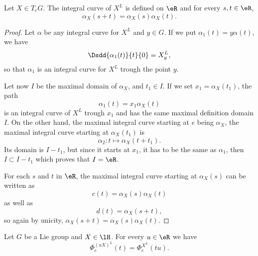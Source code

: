 \begin{proposition}     \label{PROPooWEYCooCvyHNr}
	Let \( X\in T_eG\). The integral curve of \( X^L\) is defined on \( \eR\) and for every \( s,t\in\eR\),
	\begin{equation}
		\alpha_X(s+t)=\alpha_X(s)\alpha_X(t).
	\end{equation}
\end{proposition}

\begin{proof}
	Let \( \alpha\) be any integral curve for \( X^L\) and \( y\in G\). If we put \( \alpha_1(t)=y\alpha(t)\), we have
	\begin{equation}
		\Dsdd{ \alpha_1(t) }{t}{0}=X^L_y,
	\end{equation}
	so that \( \alpha_1\) is an integral curve for \( X^L\) trough the point \( y\).

	Let now \( I\) be the maximal domain of \( \alpha_X\), and \( t_1\in I\). If we set \( x_1=\alpha_X(t_1)\), the path
	\begin{equation}
		\alpha_1(t)=x_1\alpha_X(t)
	\end{equation}
	is an integral curve of \( X^L\) trough \( x_1\) and has the same maximal definition domain \( I\). On the other hand, the maximal integral curve starting at \( e\) being \( \alpha_X\), the maximal integral curve starting at \( \alpha_X(t_1)\) is
	\begin{equation}
		\alpha_2\colon t\mapsto \alpha_X(t+t_1).
	\end{equation}
	Its domain is \( I-t_1\), but since it starts at \( x_1\), it has to be the same as \( \alpha_1\), then \( I\subset I-t_1\) which proves that \( I=\eR\).

	For each \( s\) and \( t\) in \( \eR\), the maximal integral curve starting at \( \alpha_X(s)\) can be written as
	\begin{equation}
		c(t)=\alpha_X(s)\alpha_X(t)
	\end{equation}
	as well as
	\begin{equation}
		d(t)=\alpha_X(s+t),
	\end{equation}
	so again by unicity, \( \alpha_X(s+t)=\alpha_X(s)\alpha_X(t)\).
\end{proof}

\begin{lemma}        \label{LEMooNZCJooSltfLg}
	Let \( G\) be a Lie group and \( X\in\lH\). For every \( u\in \eR\) we have
	\begin{equation}        \label{EQooMNQLooHNDpJS}
		\Phi_e^{(uX)^L}(t)=\Phi_e^{X^L}(tu).
	\end{equation}
\end{lemma}

